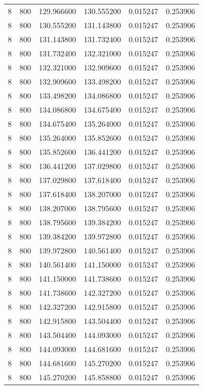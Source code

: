 \begin{longtable}{rrrrrr}
8 & 800 & 129.966600 & 130.555200 & 0.015247 & 0.253906 \\
8 & 800 & 130.555200 & 131.143800 & 0.015247 & 0.253906 \\
8 & 800 & 131.143800 & 131.732400 & 0.015247 & 0.253906 \\
8 & 800 & 131.732400 & 132.321000 & 0.015247 & 0.253906 \\
8 & 800 & 132.321000 & 132.909600 & 0.015247 & 0.253906 \\
8 & 800 & 132.909600 & 133.498200 & 0.015247 & 0.253906 \\
8 & 800 & 133.498200 & 134.086800 & 0.015247 & 0.253906 \\
8 & 800 & 134.086800 & 134.675400 & 0.015247 & 0.253906 \\
8 & 800 & 134.675400 & 135.264000 & 0.015247 & 0.253906 \\
8 & 800 & 135.264000 & 135.852600 & 0.015247 & 0.253906 \\
8 & 800 & 135.852600 & 136.441200 & 0.015247 & 0.253906 \\
8 & 800 & 136.441200 & 137.029800 & 0.015247 & 0.253906 \\
8 & 800 & 137.029800 & 137.618400 & 0.015247 & 0.253906 \\
8 & 800 & 137.618400 & 138.207000 & 0.015247 & 0.253906 \\
8 & 800 & 138.207000 & 138.795600 & 0.015247 & 0.253906 \\
8 & 800 & 138.795600 & 139.384200 & 0.015247 & 0.253906 \\
8 & 800 & 139.384200 & 139.972800 & 0.015247 & 0.253906 \\
8 & 800 & 139.972800 & 140.561400 & 0.015247 & 0.253906 \\
8 & 800 & 140.561400 & 141.150000 & 0.015247 & 0.253906 \\
8 & 800 & 141.150000 & 141.738600 & 0.015247 & 0.253906 \\
8 & 800 & 141.738600 & 142.327200 & 0.015247 & 0.253906 \\
8 & 800 & 142.327200 & 142.915800 & 0.015247 & 0.253906 \\
8 & 800 & 142.915800 & 143.504400 & 0.015247 & 0.253906 \\
8 & 800 & 143.504400 & 144.093000 & 0.015247 & 0.253906 \\
8 & 800 & 144.093000 & 144.681600 & 0.015247 & 0.253906 \\
8 & 800 & 144.681600 & 145.270200 & 0.015247 & 0.253906 \\
8 & 800 & 145.270200 & 145.858800 & 0.015247 & 0.253906 \\

\end{longtable}
